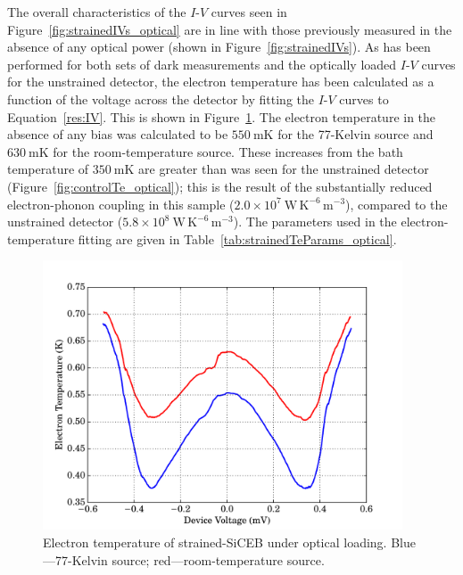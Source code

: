 \par 
The overall characteristics of the $I$-$V$ curves seen in Figure~\ref{fig:strainedIVs_optical} are in line with those previously measured in the absence of any optical power (shown in Figure~\ref{fig:strainedIVs}). As has been performed for both sets of dark measurements and the optically loaded $I$-$V$ curves for the unstrained detector, the electron temperature has been calculated as a function of the voltage across the detector by fitting the $I$-$V$ curves to Equation~\ref{res:IV}. This is shown in Figure~\ref{fig:strainedTe_optical}. The electron temperature in the absence of any bias was calculated to be $550~\mathrm{mK}$ for the 77-Kelvin source and $630~\mathrm{mK}$ for the room-temperature source. These increases from the bath temperature of $350~\mathrm{mK}$ are greater than was seen for the unstrained detector (Figure~\ref{fig:controlTe_optical}); this is the result of the substantially reduced electron-phonon coupling in this sample ($2.0 \times 10^{7}~\mathrm{W\,K^{-6}\,m^{-3}}$), compared to the unstrained detector ($5.8 \times 10^{8}~\mathrm{W\,K^{-6}\,m^{-3}}$). The parameters used in the electron-temperature fitting are given in Table~\ref{tab:strainedTeParams_optical}.
\begin{figure}[tb]
\begin{center}
\includegraphics[width = 0.95\textwidth]{figures/strained_Te_77_300}
\caption[Electron temperature of strained-SiCEB under optical loading]{Electron temperature of strained-SiCEB under optical loading. Blue---77-Kelvin source; red---room-temperature source.}
\label{fig:strainedTe_optical}
\end{center}
\end{figure}
